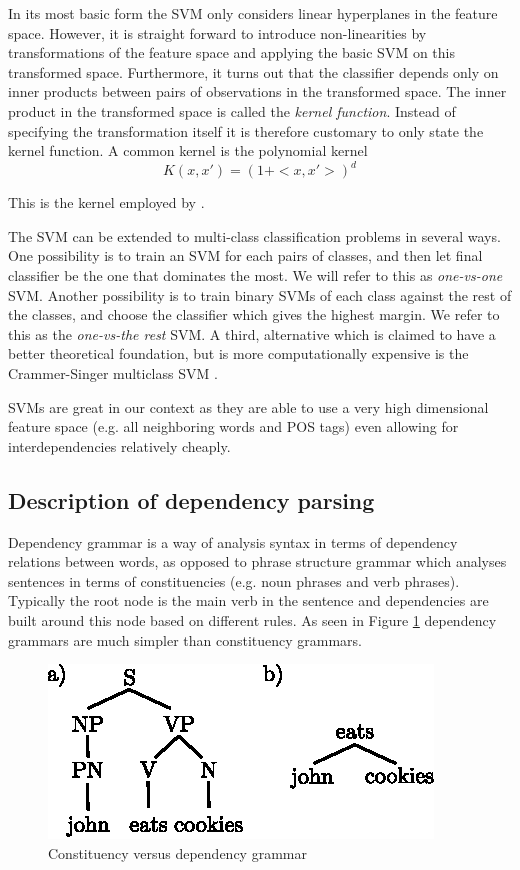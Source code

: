 \documentclass[12pt]{amsart}
\begin{document}
In its most basic form the SVM only considers linear hyperplanes in the feature space. However, it is straight forward to introduce non-linearities by transformations of the feature space and applying the basic SVM on this transformed space. Furthermore, it turns out that the classifier depends only on inner products between pairs of observations in the transformed space. The inner product in the transformed space is called the \emph{kernel function}. Instead of specifying the transformation itself it is therefore customary to only state the kernel function. A common kernel is the polynomial kernel
\[ K(x,x')=(1+ <x,x'> ) ^d \]

This is the kernel employed by \cite{yamada2003statistical}.

The SVM can be extended to multi-class classification problems in several ways. One possibility is to train an SVM for each pairs of classes, and then let final classifier be the one that dominates the most. We will refer to this as \emph{one-vs-one} SVM. Another possibility is to train binary SVMs of each class against the rest of the classes, and choose the classifier which gives the highest margin. We refer to this as the \emph{one-vs-the rest} SVM. A third, alternative which is claimed to have a better theoretical foundation, but is more computationally expensive is the Crammer-Singer multiclass SVM \cite{crammer2002algorithmic}.

SVMs are great in our context as they are able to use a very high dimensional feature space (e.g. all neighboring words and POS tags) even allowing for interdependencies relatively cheaply.


\subsection{Description of dependency parsing}

Dependency grammar is a way of analysis syntax in terms of dependency relations between words, as opposed to phrase structure grammar which analyses sentences in terms of constituencies (e.g. noun phrases and verb phrases). Typically the root node is the main verb in the sentence and dependencies are built around this node based on different rules. As seen in Figure \ref{dep} dependency grammars are much simpler than constituency grammars.
\begin{figure}
\center
\label{dep}
\caption{Constituency versus dependency grammar}
\includegraphics[scale=1.5]{dep.eps}
\end{figure}
\end{document}
